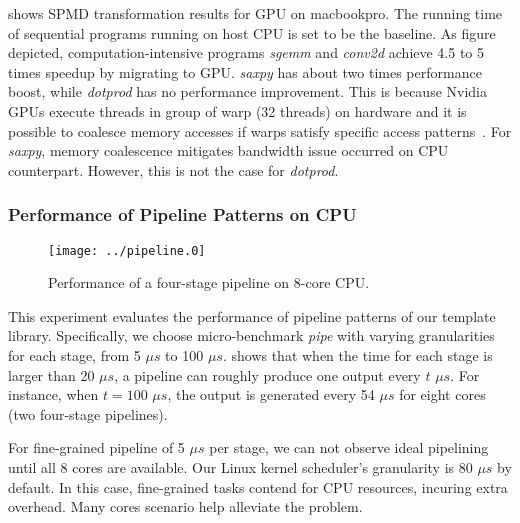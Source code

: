  shows SPMD transformation results for GPU on
macbookpro. The running time of sequential programs running on host CPU is set to
be the baseline.
As figure depicted,  computation-intensive programs
\textit{sgemm} and \textit{conv2d} achieve 4.5 to 5 times speedup
by migrating to GPU.
\textit{saxpy} has about two times performance boost, while \textit{dotprod}
has no performance improvement. This is because
Nvidia GPUs execute threads in group of warp (32 threads) on hardware and it is
possible to coalesce memory accesses if warps satisfy
specific access patterns~\cite{nvopencl}. For \textit{saxpy}, memory coalescence
mitigates bandwidth issue occurred on CPU counterpart. However, this is not
the case for \textit{dotprod}.

\subsubsection{Performance of Pipeline Patterns on CPU}
\label{exp:4}

\begin{figure}[htp]
\texttt{[image: ../pipeline.0]}
\caption{Performance of a four-stage pipeline on 8-core CPU.}
\label{fig:pipe}
\end{figure}

This experiment evaluates the performance of pipeline patterns of our template
library. Specifically, we choose micro-benchmark \textit{pipe} with varying
granularities for each stage, from 5 $\mu s$ to 100 $\mu s$.  shows
that when the time for each stage is larger than 20 $\mu s$, a pipeline can
roughly produce one output every $t$ $\mu s$. For instance, when $t=100$ $\mu s$,
the output is generated every 54 $\mu s$ for eight cores (two four-stage pipelines).

For fine-grained pipeline of 5 $\mu s$ per stage, we can not observe ideal pipelining until all 8
cores are available.  Our Linux kernel scheduler's granularity is 80
$\mu s$ by default. In this case, fine-grained tasks contend for
CPU resources, incuring extra overhead. Many cores scenario help alleviate the
problem.

